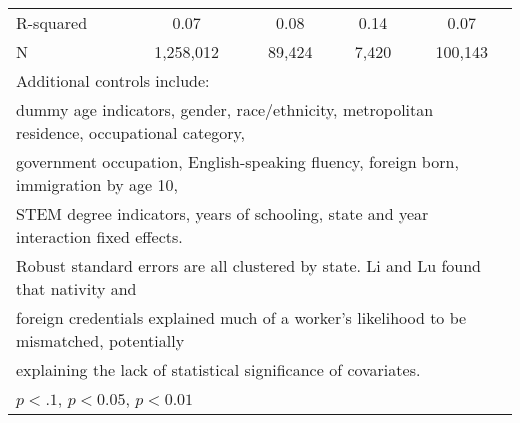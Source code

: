 \begin{table}[htbp]
\begin{tabular}{l*{4}{c}}
R-squared           &        0.07         &        0.08         &        0.14         &        0.07         \\
N                   &   1,258,012         &      89,424         &       7,420         &     100,143         \\
\bottomrule
\multicolumn{5}{l}{\footnotesize Additional controls include:}\\
\multicolumn{5}{l}{\footnotesize dummy age indicators, gender, race/ethnicity, metropolitan residence, occupational category,}\\
\multicolumn{5}{l}{\footnotesize government occupation, English-speaking fluency, foreign born, immigration by age 10,}\\
\multicolumn{5}{l}{\footnotesize STEM degree indicators, years of schooling, state and year interaction fixed effects.}\\
\multicolumn{5}{l}{\footnotesize Robust standard errors are all clustered by state. Li and Lu found that nativity and}\\
\multicolumn{5}{l}{\footnotesize foreign credentials explained much of a worker's likelihood to be mismatched, potentially}\\
\multicolumn{5}{l}{\footnotesize explaining the lack of statistical significance of covariates.}\\
\multicolumn{5}{l}{\footnotesize \sym{*} \(p<.1\), \sym{**} \(p<0.05\), \sym{***} \(p<0.01\)}\\
\end{tabular}
\end{table}

